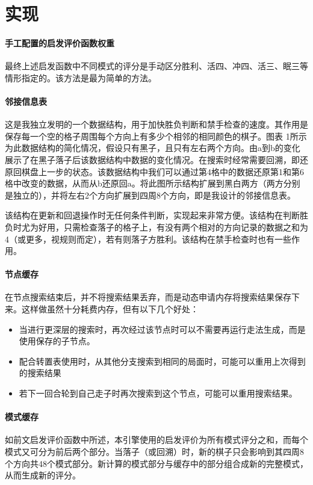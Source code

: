 \documentclass{article}
\begin{document}
\section{实现}

\paragraph{手工配置的启发评价函数权重} 最终上述启发函数中不同模式的评分是手动区分胜利、活四、冲四、活三、眠三等情形指定的。该方法是最为简单的方法。

\paragraph{邻接信息表} 这是我独立发明的一个数据结构，用于加快胜负判断和禁手检查的速度。其作用是保存每一个空的格子周围每个方向上有多少个相邻的相同颜色的棋子。图表 1所示为此数据结构的简化情况，假设只有黑子，且只有左右两个方向。由a到b的变化展示了在黑子落子后该数据结构中数据的变化情况。在搜索时经常需要回溯，即还原回棋盘上一步的状态。该数据结构中我们可以通过第4格中的数据还原第1和第6格中改变的数据，从而从b还原回a。将此图所示结构扩展到黑白两方（两方分别是独立的），并将左右2个方向扩展到四周8个方向，即是我设计的邻接信息表。

该结构在更新和回退操作时无任何条件判断，实现起来非常方便。该结构在判断胜负时尤为好用，只需检查落子的格子上，有没有两个相对的方向记录的数据之和为4（或更多，视规则而定），若有则落子方胜利。该结构在禁手检查时也有一些作用。

\paragraph{节点缓存} 在节点搜索结束后，并不将搜索结果丢弃，而是动态申请内存将搜索结果保存下来。这样做虽然十分耗费内存，但有以下几个好处：
\begin{itemize}
    \item 当进行更深层的搜索时，再次经过该节点时可以不需要再运行走法生成，而是使用保存的子节点。
    \item 配合转置表使用时，从其他分支搜索到相同的局面时，可能可以重用上次得到的搜索结果
    \item 若下一回合轮到自己走子时再次搜索到这个节点，可能可以重用搜索结果。    
\end{itemize}

\paragraph{模式缓存} 如前文启发评价函数中所述，本引擎使用的启发评价为所有模式评分之和，而每个模式又可分为前后两个部分。当落子（或回溯）时，新的棋子只会影响到其四周8个方向共48个模式部分。新计算的模式部分与缓存中的部分组合成新的完整模式，从而生成新的评分。
\end{document}
